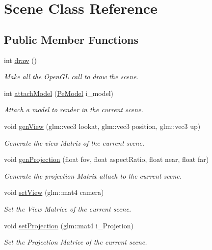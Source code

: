 \hypertarget{classScene}{\section{Scene Class Reference}
\label{classScene}
}
\subsection*{Public Member Functions}
\begin{DoxyCompactItemize}
\item 
int \hyperlink{classScene_a0beda0caae14c7bde9c3449f02aaef6b}{draw} ()
\begin{DoxyCompactList}\small\item\em Make all the Open\-G\-L call to draw the scene. \end{DoxyCompactList}\item 
int \hyperlink{classScene_ab6a0d0c8751e627c5c19d9ccb6f6afc3}{attach\-Model} (\hyperlink{structPeModel}{Pe\-Model} i\-\_\-model)
\begin{DoxyCompactList}\small\item\em Attach a model to render in the current scene. \end{DoxyCompactList}\item 
void \hyperlink{classScene_ad87663cb76a7594946308e8f735a1df6}{gen\-View} (glm\-::vec3 lookat, glm\-::vec3 position, glm\-::vec3 up)
\begin{DoxyCompactList}\small\item\em Generate the view Matrix of the current scene. \end{DoxyCompactList}\item 
void \hyperlink{classScene_a0bae0e69c5a972162ffe288df1d134a2}{gen\-Projection} (float fov, float aspect\-Ratio, float near, float far)
\begin{DoxyCompactList}\small\item\em Generate the projection Matrix attach to the current scene. \end{DoxyCompactList}\item 
void \hyperlink{classScene_af5ae8c94c6fba5868a524ab4fd64a6e1}{set\-View} (glm\-::mat4 camera)
\begin{DoxyCompactList}\small\item\em Set the View Matrice of the current scene. \end{DoxyCompactList}\item 
void \hyperlink{classScene_ad67b74e5b65f98f1b041dfda5b054d82}{set\-Projection} (glm\-::mat4 i\-\_\-\-Projetion)
\begin{DoxyCompactList}\small\item\em Set the Projection Matrice of the current scene. \end{DoxyCompactList}\end{DoxyCompactItemize}


